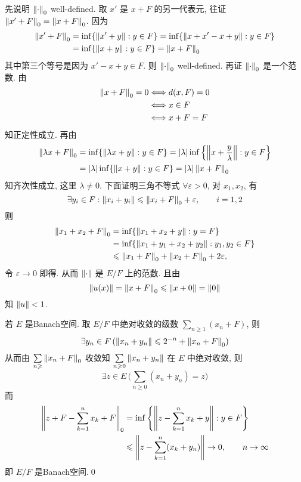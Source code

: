 	\begin{Proof}
		先说明 $ \left\| \cdot \right\|_{0} $ well-defined. 取 $ x' $ 是 $ x+F $ 的另一代表元, 往证 $ \left\| x'+F \right\|_{0}=\left\| x+F \right\|_{0} $. 因为
		\[
			\begin{aligned}
				\left\| x'+F \right\|_{0} & =\inf\{ \left\| x'+y \right\|:y\in F \}  = \inf\{ \left\| x+x'-x+y \right\|: y\in F \} \\
				 & =\inf\{ \left\| x+y \right\|: y\in F \}=\left\| x+F \right\|_{0}
			\end{aligned}
		\]
		其中第三个等号是因为 $ x'-x+y\in F $. 则 $ \left\| \cdot \right\|_{0} $ well-defined. 再证 $ \left\| \cdot \right\|_{0} $ 是一个范数. 由
		\[
			\begin{aligned}
				\left\| x+F \right\|_{0}=0 & \Longleftrightarrow d(x, F)=0\\
				&  \Longleftrightarrow x\in F\\
				& \Longleftrightarrow x+F=F
			\end{aligned}
		\]
		知正定性成立. 再由
		\[
			\begin{aligned}
				\left\| \lambda x+F \right\|_{0} & =\inf\{ \left\| \lambda x+y \right\|: y\in F \}=\left| \lambda \right| \inf\left\{ \left\| x+\frac{y}{\lambda} \right\|: y\in F \right\}\\
				& =\left| \lambda \right| \inf\{ \left\| x+y \right\|: y\in F \}=\left| \lambda \right| \left\| x+F \right\|_{0}
			\end{aligned}
		\]
		知齐次性成立, 这里 $ \lambda\neq0 $. 下面证明三角不等式 $ \forall\varepsilon>0 $, 对 $ x_{1}, x_{2} $, 有
		\[
			\exists y_{i}\in F : \left\| x_{i}+y_{i} \right\|\leqslant\left\| x_{i}+F \right\|_{0}+\varepsilon, \qquad i=1, 2
		\]
		则
		\[
			\begin{aligned}
				\left\| x_{1}+x_{2}+F \right\|_{0} & =\inf\{ \left\| x_{1}+x_{2}+y \right\|: y=F \}\\
				& =\inf\{ \left\| x_{1}+y_{1}+x_{2}+y_{2} \right\|: y_{1}, y_{2}\in F \}\\
				& \leqslant \left\| x_{1}+F \right\|_{0}+\left\| x_{2}+F \right\|_{0}+2\varepsilon,
			\end{aligned}
		\]
		令 $ \varepsilon\to 0 $ 即得. 从而 $ \left\| \cdot \right\| $ 是 $ E/F $ 上的范数. 且由
		\[
			 \left\| u(x) \right\|=\left\| x+F \right\|_{0}\leqslant \left\| x+0 \right\|=\left\| 0 \right\|
		\]
		知 $ \left\| u \right\|<1 $.

		若 $ E $ 是Banach空间. 取 $ E/F $ 中绝对收敛的级数 $ \sum\limits_{n\geqslant1}(x_{n}+F) $, 则
		\[
			\exists y_{n}\in F\,(\left\| x_{n}+y_{n} \right\|\leqslant 2^{-n}+\left\| x_{n}+F \right\|_{0})
		\]
		从而由 $ \sum\limits_{n\geqslant}\left\| x_{n}+F \right\|_{0} $ 收敛知 $ \sum\limits_{n\geqslant0}\left\| x_{n}+y_{n} \right\| $ 在 $ E $ 中绝对收敛, 则
		\[
			\exists z\in E\,\bigg( \sum_{n\geqslant0}(x_{n}+y_{n})=z \bigg)
		\]
		而 
		\[
			\begin{aligned}
				\left\| z+F-\sum_{k=1}^{n}x_{k}+F \right\|_{0} & =\inf\left\{ \left\| z-\sum_{k=1}^{n}x_{k}+y \right\|:y\in F \right\}\\
				& \leqslant \left\| z-\sum_{k=1}^{n}(x_{k}+y_{n}) \right\|\to 0,\qquad n\to\infty
			\end{aligned}
		\]
		即 $ E/F $ 是Banach空间.\qed
	\end{Proof}
	
